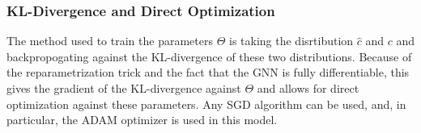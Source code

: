 \subsubsection{KL-Divergence and Direct Optimization}
The method used to train the parameters $\Theta$ is taking the disrtibution $\hat{c}$ and $c$ and backpropogating against the KL-divergence of these two distributions. Because of the reparametrization trick and the fact that the GNN is fully differentiable, this gives the gradient of the KL-divergence against $\Theta$ and allows for direct optimization against these parameters. Any SGD algorithm can be used, and, in particular, the ADAM optimizer \cite{kingma_adam_2017} is used in this model.

\newpage
